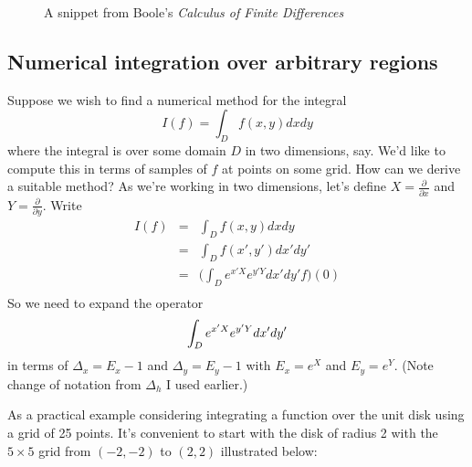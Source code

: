 \documentclass[a4paper]{article}
\theoremstyle{definition}
\begin{document}
\begin{figure}
\centering
{}
\caption{A snippet from Boole's \emph{Calculus of Finite Differences}}
\end{figure}

\subsection{Numerical integration over arbitrary regions}
Suppose we wish to find a numerical method for the integral
\[
I(f) = \int_D f(x,y)dxdy
\]
where the integral is over some domain $D$ in two dimensions, say.
We'd like to compute this in terms of samples of $f$ at points on some grid.
How can we derive a suitable method?
As we're working in two dimensions, let's define $X=\frac{\partial}{\partial x}$ and $Y=\frac{\partial}{\partial y}$.
Write
\begin{eqnarray*}
I(f) & = & \int_D f(x,y)dxdy \\
     & = & \int_D f(x',y')dx'dy' \\
     & = & \Big(\int_D e^{x'X}e^{y'Y}dx'dy' f\Big)(0) \\
\end{eqnarray*}
So we need to expand the operator
\[
\int_D e^{x'X}e^{y'Y}dx'dy' \\
\]
in terms of $\Delta_x = E_x-1$ and $\Delta_y = E_y-1$ with $E_x=e^X$ and $E_y=e^Y$.
(Note change of notation from $\Delta_h$ I used earlier.)

As a practical example considering integrating a function over the unit disk using a grid of 25 points.
It's convenient to start with the disk of radius 2 with the $5\times 5$ grid from $(-2,-2)$ to $(2,2)$ illustrated below:

\begin{figure}[H]
\centering
{}
\end{figure}
\end{document}
